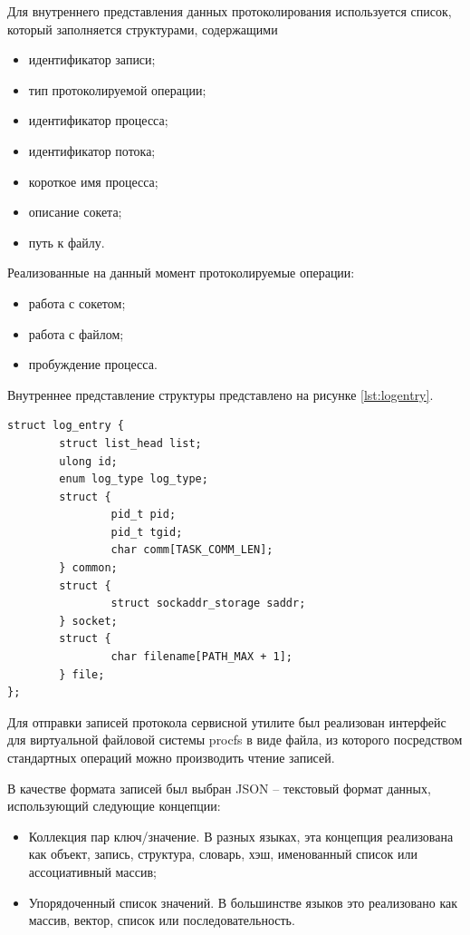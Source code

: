 \documentclass{gost7.32-2001}
\begin{document}
Для внутреннего представления данных протоколирования используется
список, который заполняется структурами, содержащими
\begin{itemize}
\item
  идентификатор записи;
\item
  тип протоколируемой операции;
\item
  идентификатор процесса;
\item
  идентификатор потока;
\item
  короткое имя процесса;
\item
  описание сокета;
\item
  путь к файлу.
\end{itemize}

Реализованные на данный момент протоколируемые операции:
\begin{itemize}
\item
  работа с сокетом;
\item
  работа с файлом;
\item
  пробуждение процесса.
\end{itemize}

Внутреннее представление структуры представлено на рисунке
\ref{lst:logentry}.

\begin{lstlisting}[caption={Структура записи},
    captionpos=b, float, label={lst:logentry}]
struct log_entry {
        struct list_head list;
        ulong id;
        enum log_type log_type;
        struct {
                pid_t pid;
                pid_t tgid;
                char comm[TASK_COMM_LEN];
        } common;
        struct {
                struct sockaddr_storage saddr;
        } socket;
        struct {
                char filename[PATH_MAX + 1];
        } file;
};
\end{lstlisting}

Для отправки записей протокола сервисной утилите был реализован
интерфейс для виртуальной файловой системы procfs в виде файла, из
которого посредством стандартных операций можно производить чтение
записей.

В качестве формата записей был выбран JSON -- текстовый формат
данных, использующий следующие концепции:
\begin{itemize}
\item
  Коллекция пар ключ/значение. В разных языках, эта концепция
  реализована как объект, запись, структура, словарь, хэш, именованный
  список или ассоциативный массив;
\item
  Упорядоченный список значений. В большинстве языков это реализовано
  как массив, вектор, список или последовательность.
\end{itemize}
\end{document}

